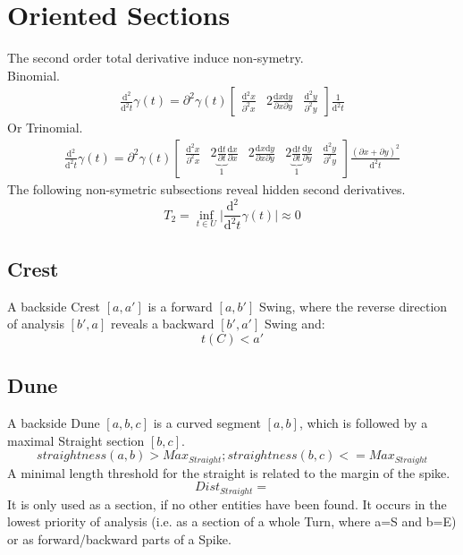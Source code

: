 \documentclass{report}
\begin{document}
\section{Oriented Sections}
The second order total derivative induce non-symetry.\\
Binomial.
\begin{align}
\frac{\mathrm{d}^2}{\mathrm{d}^2t}\gamma(t)=\partial^2 \gamma(t) \begin{bmatrix} \frac{\mathrm{d}^2x}{\partial^2 x} & 2 \frac{\mathrm{d}x\mathrm{d}y}{\partial x \partial y} & \frac{\mathrm{d}^2y}{\partial^2 y}\end{bmatrix}\frac{1}{\mathrm{d}^2t}
\end{align}
Or Trinomial.
\begin{align}
\frac{\mathrm{d}^2}{\mathrm{d}^2t}\gamma(t)=\partial^2 \gamma (t) \begin{bmatrix}\frac{\mathrm{d}^2 x}{\partial^2 x} & 2 \underbrace{\frac{\mathrm{d}t}{\partial t}}_{1} \frac{\mathrm{d}x}{\partial x} & 2 \frac{\mathrm{d}x\mathrm{d}y}{\partial x \partial y} & 2 \underbrace{\frac{\mathrm{d}t}{\partial t}}_{1} \frac{\mathrm{d}y}{\partial y} & \frac{\mathrm{d}^2 y}{\partial^2 y}\end{bmatrix}\frac{(\partial x + \partial y)^2}{\mathrm{d}^2 t}
\end{align}
The following non-symetric subsections reveal hidden second derivatives.
\begin{equation}
T_{2} = \inf_{t \in U} \lvert \frac{\mathrm{d}^2}{\mathrm{d}^2t}\gamma(t) \rvert \approx 0
\end{equation}

\subsection{Crest}
A backside Crest $[a,a']$ is a forward $[a,b']$ Swing, where the reverse direction of analysis $[b',a]$ reveals a backward $[b',a']$ Swing  and:
\begin{equation}
t(C)<a'
\end{equation}

\subsection{Dune}
A backside Dune $[a,b,c]$ is a curved segment $[a,b]$, which is followed by a maximal Straight section $[b,c]$.
\begin{equation}
straightness(a,b)>Max_{Straight};straightness(b,c)<=Max_{Straight}
\end{equation}
A minimal length threshold for the straight is related to the margin of the spike.
\begin{equation}
Dist_{Straight}=
\end{equation}
It is only used as a section, if no other entities have been found. It occurs in the lowest priority of analysis (i.e. as a section of a whole Turn, where a=S and b=E) or as forward/backward parts of a Spike.
\end{document}
